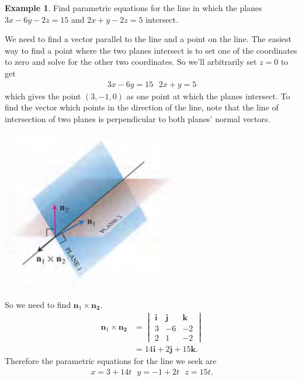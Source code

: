 \documentclass[12pt, letter]{article}
\theoremstyle{plain}
\numberwithin{theorem}{section}
\theoremstyle{definition}
\newtheorem{example}[theorem]{Example}
\begin{document}
\begin{example}
Find parametric equations for the line in which the planes $3x-6y-2z=15$ and $2x+y-2z=5$ intersect.

\smallskip

We need to find a vector parallel to the line and a point on the line. The easiest way to find a point where the two planes intersect is to set one of the coordinates to zero and solve for the other two coordinates. So we'll arbitrarily set $z=0$ to get
\begin{align*}
3x-6y = 15 \ \ \ 2x+y=5
\end{align*}
which gives the point $(3,-1,0)$ as one point at which the planes intersect. To find the vector which points in the direction of the line, note that the line of intersection of two planes is perpendicular to both planes' normal vectors.

\bigskip

\begin{center}
\includegraphics[scale=0.7]{m1_f16}
\end{center}

\bigskip
So we need to find $\bm{n}_1 \times \bm{n_2}$.
\begin{align*}
\bm{n}_1 \times \bm{n_2} &= \begin{vmatrix} \bm{i} & \bm{j} & \bm{k} \\ 3 & -6 & -2 \\ 2 & 1 & -2 \end{vmatrix}\\
&= 14\bm{i} + 2\bm{j} + 15\bm{k}.
\end{align*}
Therefore the parametric equations for the line we seek are
\begin{align*}
x=3+14t \ \ \ y=-1+2t \ \ \ z=15t.
\end{align*}
\end{example}
\end{document}
